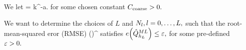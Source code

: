 \label{ass:coarse}
We let
\beqs
\hz = \Ccoarse k^{-a}.
\eeqs
for some chosen constant $C_{\mathrm{coarse}} > 0.$
\eas

 
 
 We want to determine the choices of $L$ and $N_{l}, l = 0,\ldots,L,$ such that the root-mean-squared eror (RMSE)
 \beqs
 \err{\QhatMLhL} \de \mleft(\mright)^{\half}
 \eeqs
 satisfies $\err{\QhatMLhL} \leq \eps,$ for some pre-defined $\varepsilon > 0.$



%








